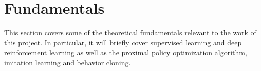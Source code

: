 \chapter{Fundamentals}
This section covers some of the theoretical fundamentals relevant to the work of this project. In particular, it will briefly cover supervised learning and deep reinforcement learning as well as the proximal policy optimization algorithm, imitation learning and behavior cloning.




